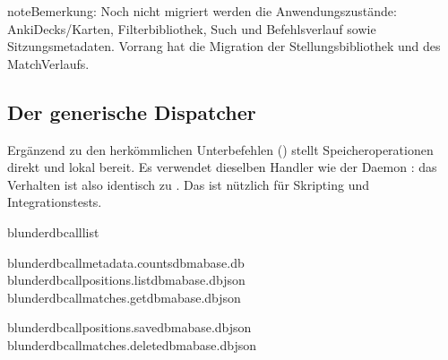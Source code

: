 \documentclass[letterpaper,10pt,german]{sphinxmanual}
\begin{document}
\begin{sphinxadmonition}{note}{Bemerkung:}
\sphinxAtStartPar
Noch nicht migriert werden die Anwendungszustände: Anki\sphinxhyphen{}Decks/\sphinxhyphen{}Karten, Filterbibliothek, Such\sphinxhyphen{} und Befehlsverlauf sowie Sitzungsmetadaten. Vorrang hat die Migration der Stellungsbibliothek und des Match\sphinxhyphen{}Verlaufs.
\end{sphinxadmonition}


\subsection{Der generische Dispatcher }
\label{\detokenize{mode_headless:le-dispatcher-generique-call}}\label{\detokenize{mode_headless:headless-call}}
\sphinxAtStartPar
Ergänzend zu den herkömmlichen Unterbefehlen ({\hyperref[\detokenize{cli:cli}]{}}) stellt   Speicheroperationen direkt und lokal bereit. Es verwendet dieselben Handler wie der Daemon : das Verhalten ist also identisch zu . Das ist nützlich für Skripting und Integrationstests.

\begin{sphinxVerbatim}[commandchars=\\\{\}]
blunderdbcall\PYGZhy{}\PYGZhy{}list

blunderdbcallmetadata.counts\PYGZhy{}\PYGZhy{}dbma\PYGZus{}base.db
blunderdbcallpositions.list\PYGZhy{}\PYGZhy{}dbma\PYGZus{}base.db\PYGZhy{}\PYGZhy{}json
blunderdbcallmatches.get\PYGZhy{}\PYGZhy{}dbma\PYGZus{}base.db\PYGZhy{}\PYGZhy{}json

blunderdbcallpositions.save\PYGZhy{}\PYGZhy{}dbma\PYGZus{}base.db\PYGZhy{}\PYGZhy{}json
blunderdbcallmatches.delete\PYGZhy{}\PYGZhy{}dbma\PYGZus{}base.db\PYGZhy{}\PYGZhy{}json
\end{sphinxVerbatim}
\end{document}
